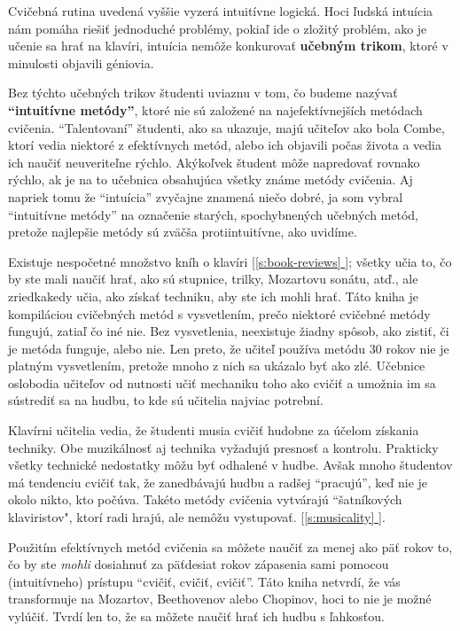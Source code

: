 \documentclass[11pt,a4paper]{book}
\newcommand*{\fullref}[1]{\hyperref[{#1}]{\ref*{#1} \nameref*{#1}}} %
\newcommand*{\fullrefp}[1]{[\fullref{#1}]} %
\begin{document}
Cvičebná rutina uvedená vyššie vyzerá intuitívne logická. Hoci ľudská intuícia nám pomáha riešiť jednoduché problémy, pokiaľ ide o zložitý problém, ako je učenie sa hrať na klavíri, intuícia nemôže konkurovať \textbf{učebným trikom}, ktoré v minulosti objavili géniovia.

Bez týchto učebných trikov študenti uviaznu v tom, čo budeme nazývať \textbf{“intuitívne metódy”}, ktoré nie sú založené na najefektívnejších metódach cvičenia. “Talentovaní” študenti, ako sa ukazuje, majú učiteľov ako bola Combe, ktorí vedia niektoré z efektívnych metód, alebo ich objavili počas života a vedia ich naučiť neuveriteľne rýchlo. Akýkoľvek študent môže napredovať rovnako rýchlo, ak je na to učebnica obsahujúca všetky známe metódy cvičenia. Aj napriek tomu že “intuícia” zvyčajne znamená niečo dobré, ja som vybral “intuitívne metódy” na označenie starých, spochybnených učebných metód, pretože najlepšie metódy sú zväčša protiintuitívne, ako uvidíme. 

Existuje nespočetné množstvo kníh o klavíri \fullrefp{s:book-reviews}; všetky učia to, čo by ste mali  naučiť hrať, ako sú stupnice, trilky, Mozartovu sonátu, atď., ale zriedkakedy učia, ako získať techniku, aby ste ich mohli hrať. Táto kniha je kompiláciou cvičebných metód s vysvetlením, prečo niektoré cvičebné metódy fungujú, zatiaľ čo iné nie. Bez vysvetlenia, neexistuje žiadny spôsob, ako zistiť, či je metóda funguje, alebo nie. Len preto, že učiteľ používa metódu 30 rokov nie je platným vysvetlením, pretože mnoho z nich sa ukázalo byť ako zlé. Učebnice oslobodia učiteľov od nutnosti učiť mechaniku toho ako cvičiť a umožnia im sa sústrediť sa na hudbu, to kde sú učitelia najviac potrební.

Klavírni učitelia vedia, že študenti musia cvičiť hudobne za účelom získania techniky. Obe muzikálnosť aj technika vyžadujú presnosť a kontrolu. Prakticky všetky technické nedostatky môžu byť odhalené v hudbe. Avšak mnoho študentov má tendenciu cvičiť tak, že zanedbávajú hudbu a radšej “pracujú”, keď nie je okolo nikto, kto počúva. Takéto metódy cvičenia vytvárajú “šatníkových klaviristov", ktorí radi hrajú, ale nemôžu vystupovať. \fullrefp{s:musicality}.

Použitím efektívnych metód cvičenia sa môžete naučiť za menej ako päť rokov to, čo by ste \emph{mohli} dosiahnuť za päťdesiat rokov zápasenia sami pomocou (intuitívneho) prístupu “cvičiť, cvičiť, cvičiť”. Táto kniha netvrdí, že vás transformuje na Mozartov, Beethovenov alebo Chopinov, hoci to nie je možné vylúčiť. Tvrdí len to, že sa môžete naučiť hrať ich hudbu s ľahkosťou.
\end{document}
